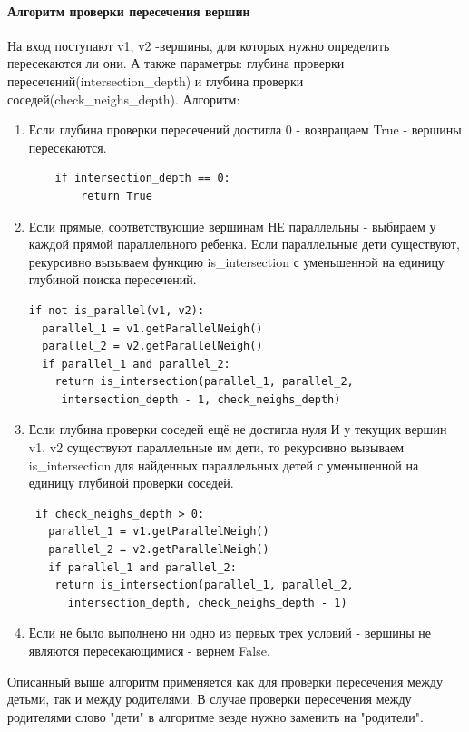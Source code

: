 \paragraph{Алгоритм проверки пересечения вершин}
\label{intersection}
На вход поступают v1, v2 -вершины, для которых нужно определить пересекаются ли они.
А также параметры: глубина проверки пересечений(intersection\_depth) и глубина проверки соседей(check\_neighs\_depth).
\newline
Алгоритм:
\begin{enumerate}
	\item Если глубина проверки пересечений достигла 0 - возвращаем True - вершины пересекаются.
	\begin{lstlisting}
    if intersection_depth == 0:
		return True
	\end{lstlisting}
	\item Если прямые, соответствующие вершинам НЕ параллельны - выбираем у каждой прямой параллельного ребенка. Если параллельные дети существуют, рекурсивно вызываем функцию is\_intersection с уменьшенной на единицу глубиной поиска пересечений.
	\begin{lstlisting}
if not is_parallel(v1, v2):
  parallel_1 = v1.getParallelNeigh()
  parallel_2 = v2.getParallelNeigh()
  if parallel_1 and parallel_2:
    return is_intersection(parallel_1, parallel_2,
     intersection_depth - 1, check_neighs_depth)
	\end{lstlisting}
	\item Если глубина проверки соседей ещё не достигла нуля И у текущих вершин v1, v2 существуют параллельные им дети, то рекурсивно вызываем is\_intersection для найденных параллельных детей с уменьшенной на единицу глубиной проверки соседей.
	\begin{lstlisting}
 if check_neighs_depth > 0:
   parallel_1 = v1.getParallelNeigh()
   parallel_2 = v2.getParallelNeigh()
   if parallel_1 and parallel_2:
    return is_intersection(parallel_1, parallel_2,
      intersection_depth, check_neighs_depth - 1)
	\end{lstlisting}
	\item Если не было выполнено ни одно из первых трех условий - вершины не являются пересекающимися - вернем False.
\end{enumerate}
Описанный выше алгоритм применяется как для проверки пересечения между детьми, так и между родителями. В случае проверки пересечения между родителями слово "дети" в алгоритме везде нужно заменить на "родители".

